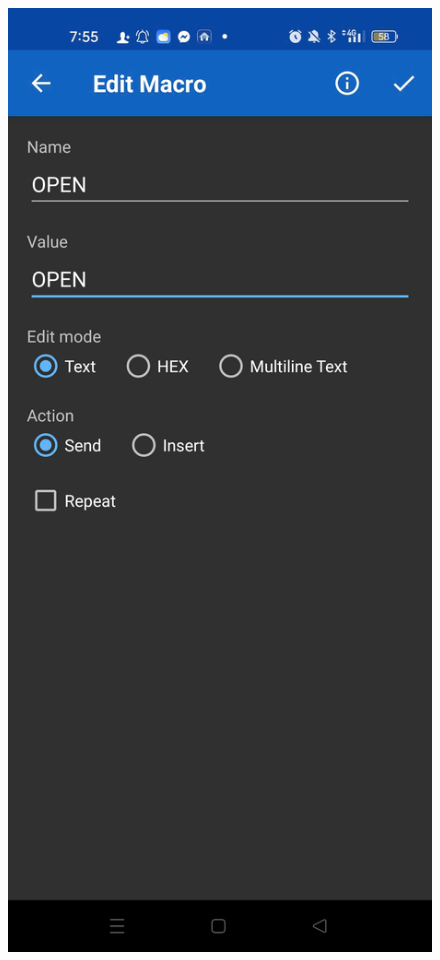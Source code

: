 \documentclass[conference, onecolumn]{IEEEtran}
\begin{document}
\begin{figure}[H]
\begin{minipage}[b]{0.3\textwidth}
	\end{minipage}
	\hspace{0.03\textwidth}
	\begin{minipage}[b]{0.3\textwidth}
		\centering
		\includegraphics[width=\textwidth]{z6844982521556_dca768482353bb117f4c4fd86b55282d.jpg}

\end{minipage}
\end{figure}
\end{document}
